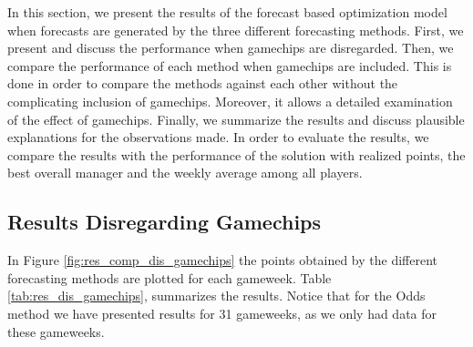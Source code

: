 In this section, we present the results of the forecast based optimization model when forecasts are generated by the three different forecasting methods. First, we present and discuss the performance when gamechips are disregarded. Then, we compare the performance of each method when gamechips are included. This is done in order to compare the methods against each other without the complicating inclusion of gamechips. Moreover, it allows a detailed examination of the effect of gamechips. Finally, we summarize the results and discuss plausible explanations for the observations made. In order to evaluate the results, we compare the results with the performance of the solution with realized points, the best overall manager and the weekly average among all players.

\newpage

\subsection{Results Disregarding Gamechips}

In Figure \ref{fig:res_comp_dis_gamechips} the points obtained by the different forecasting methods are plotted for each gameweek. Table \ref{tab:res_dis_gamechips}, summarizes the results. Notice that for the Odds method we have presented results for 31 gameweeks, as we only had data for these gameweeks.

